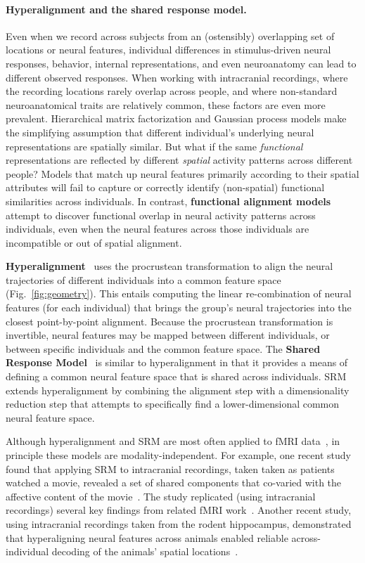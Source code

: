 \documentclass[runningheads]{llncs}
\begin{document}
\paragraph{Hyperalignment and the shared response model.}
Even when we record across subjects from an (ostensibly) overlapping
set of locations or neural features, individual differences in
stimulus-driven neural responses, behavior, internal representations,
and even neuroanatomy can lead to different observed responses.  When
working with intracranial recordings, where the recording locations
rarely overlap across people, and where non-standard neuroanatomical
traits are relatively common, these factors are even more prevalent.
Hierarchical matrix factorization and Gaussian process models make the
simplifying assumption that different individual's underlying neural
representations are spatially similar.  But what if the same
\textit{functional} representations are reflected by different
\textit{spatial} activity patterns across different people?  Models
that match up neural features primarily according to their spatial attributes
will fail to capture or correctly identify (non-spatial) functional
similarities across individuals.  In contrast, \textbf{functional
  alignment models} attempt to discover functional overlap in neural
activity patterns across individuals, even when the neural features
across those individuals are incompatible or out of spatial alignment.

\textbf{Hyperalignment}~\citep{HaxbEtal11} uses the procrustean
transformation to align the neural trajectories of different
individuals into a common feature space (Fig.~\ref{fig:geometry}).
This entails computing the linear re-combination of neural features
(for each individual) that brings the group's neural trajectories into
the closest point-by-point alignment.  Because the procrustean
transformation is invertible, neural features may be mapped between
different individuals, or between specific individuals and the common
feature space.  The \textbf{Shared Response
  Model}~\citep[SRM;][]{ChenEtal15a} is similar to hyperalignment in
that it provides a means of defining a common neural feature space
that is shared across individuals.  SRM extends hyperalignment by
combining the alignment step with a dimensionality reduction step that
attempts to specifically find a lower-dimensional common neural
feature space.

Although hyperalignment and SRM are most often applied to fMRI
data~\citep{HaxbEtal20}, in principle these models are
modality-independent.  For example, one recent study found that
applying SRM to intracranial recordings, taken taken as patients
watched a movie, revealed a set of shared components that co-varied
with the affective content of the movie~\citep{XieEtal21}.  The study
replicated (using intracranial recordings) several key findings from
related fMRI work~\citep{ChanEtal21a}.  Another recent study, using
intracranial recordings taken from the rodent hippocampus,
demonstrated that hyperaligning neural features across animals enabled
reliable across-individual decoding of the animals' spatial
locations~\citep{ChenEtal21}.
\end{document}
